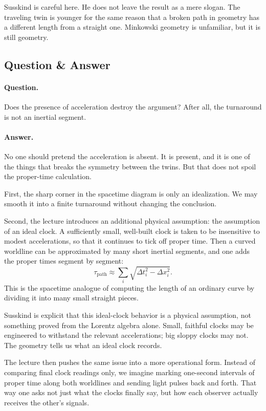 Susskind is careful here. He does not leave the result as a mere slogan. The traveling twin is younger for the same reason that a broken path in geometry has a different length from a straight one. Minkowski geometry is unfamiliar, but it is still geometry.

\subsection{Question \& Answer}

\paragraph{Question.} Does the presence of acceleration destroy the argument? After all, the turnaround is not an inertial segment.

\paragraph{Answer.} No one should pretend the acceleration is absent. It is present, and it is one of the things that breaks the symmetry between the twins. But that does not spoil the proper-time calculation.

First, the sharp corner in the spacetime diagram is only an idealization. We may smooth it into a finite turnaround without changing the conclusion.

Second, the lecture introduces an additional physical assumption: the assumption of an ideal clock. A sufficiently small, well-built clock is taken to be insensitive to modest accelerations, so that it continues to tick off proper time. Then a curved worldline can be approximated by many short inertial segments, and one adds the proper times segment by segment:
\begin{equation}
\tau_{\mathrm{path}} \approx \sum_i \sqrt{\Delta t_i^2-\Delta x_i^2}.
\end{equation}
This is the spacetime analogue of computing the length of an ordinary curve by dividing it into many small straight pieces.

Susskind is explicit that this ideal-clock behavior is a physical assumption, not something proved from the Lorentz algebra alone. Small, faithful clocks may be engineered to withstand the relevant accelerations; big sloppy clocks may not. The geometry tells us what an ideal clock records.

The lecture then pushes the same issue into a more operational form. Instead of comparing final clock readings only, we imagine marking one-second intervals of proper time along both worldlines and sending light pulses back and forth. That way one asks not just what the clocks finally say, but how each observer actually receives the other's signals.

